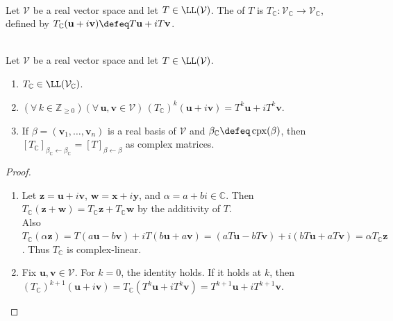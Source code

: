\begin{definition} \label{def:complexification-real-operator} \\
Let $\mathcal{V}$ be a real vector space and let $T\in\LL(\mathcal{V})$. The  of $T$ is $T_{\mathbb{C}}:\mathcal{V}_{\mathbb{C}}\to\mathcal{V}_{\mathbb{C}}$, defined by $T_{\mathbb{C}}(\mathbf{u}+i\mathbf{v})\defeq T\mathbf{u}+iT\mathbf{v}$.
\end{definition}

\begin{proposition} \label{prop:complexification-operator-basic-properties} \\
Let $\mathcal{V}$ be a real vector space and let $T\in\LL(\mathcal{V})$.
\begin{enumerate}[label=(\roman*)]
\setlength{\itemsep}{0pt}
\item $T_{\mathbb{C}}\in\LL(\mathcal{V}_{\mathbb{C}})$.
\item $(\forall\,k\in\mathbb{Z}_{\geq0})(\forall\,\mathbf{u},\mathbf{v}\in\mathcal{V})\,(T_{\mathbb{C}})^k(\mathbf{u}+i\mathbf{v})=T^k\mathbf{u}+iT^k\mathbf{v}$.
\item If $\beta=(\mathbf{v}_1,\ldots,\mathbf{v}_n)$ is a real basis of $\mathcal{V}$ and $\beta_{\mathbb{C}}\defeq\operatorname{cpx}(\beta)$, then $[T_{\mathbb{C}}]_{\beta_{\mathbb{C}}\leftarrow\beta_{\mathbb{C}}}=[T]_{\beta\leftarrow\beta}$ as complex matrices.
\end{enumerate}
\begin{proof}
\begin{enumerate}[label=(\roman*)]
\setlength{\itemsep}{0pt}
\item Let $\mathbf{z}=\mathbf{u}+i\mathbf{v}$, $\mathbf{w}=\mathbf{x}+i\mathbf{y}$, and $\alpha=a+bi\in\mathbb{C}$. Then $T_{\mathbb{C}}(\mathbf{z}+\mathbf{w})=T_{\mathbb{C}}\mathbf{z}+T_{\mathbb{C}}\mathbf{w}$ by the additivity of $T$.\\
Also $T_{\mathbb{C}}(\alpha\mathbf{z})=T(a\mathbf{u}-b\mathbf{v})+iT(b\mathbf{u}+a\mathbf{v})=(aT\mathbf{u}-bT\mathbf{v})+i(bT\mathbf{u}+aT\mathbf{v})=\alpha T_{\mathbb{C}}\mathbf{z}$. Thus $T_{\mathbb{C}}$ is complex-linear.
\item Fix $\mathbf{u},\mathbf{v}\in\mathcal{V}$. For $k=0$, the identity holds. If it holds at $k$, then $(T_{\mathbb{C}})^{k+1}(\mathbf{u}+i\mathbf{v})=T_{\mathbb{C}}(T^k\mathbf{u}+iT^k\mathbf{v})=T^{k+1}\mathbf{u}+iT^{k+1}\mathbf{v}$.\\

\end{enumerate}
\end{proof}
\end{proposition}
